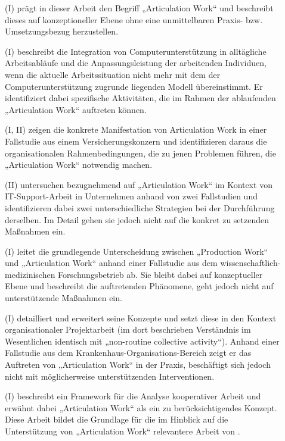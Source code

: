 \begin{description}
	\item[\citet{Strauss85}] (I) prägt in dieser Arbeit den Begriff „Articulation Work“ und beschreibt dieses auf konzeptioneller Ebene ohne eine unmittelbaren Praxis- bzw. Umsetzungsbezug herzustellen.
	\item[\citet{Gasser86}] (I) beschreibt die Integration von Computerunterstützung in alltägliche Arbeitsabläufe und die Anpassungsleistung der arbeitenden Individuen, wenn die aktuelle Arbeitssituation nicht mehr mit dem der Computerunterstützung zugrunde liegenden Modell übereinstimmt. Er identifiziert dabei spezifische Aktivitäten, die im Rahmen der ablaufenden „Articulation Work“ auftreten können.
	\item[\citet{Gerson86}] (I, II) zeigen die konkrete Manifestation von Articulation Work in einer Fallstudie aus einem Versicherungskonzern und identifizieren daraus die organisationalen Rahmenbedingungen, die zu jenen Problemen führen, die „Articulation Work“ notwendig machen.
	\item[\citet{Bendifallah87}] (II) untersuchen bezugnehmend auf \citet{Gasser86} „Articulation Work“ im Kontext von IT-Support-Arbeit in Unternehmen anhand von zwei Fallstudien und identifizieren dabei zwei unterschiedliche Strategien bei der Durchführung derselben. Im Detail gehen sie jedoch nicht auf die konkret zu setzenden Maßnahmen ein.
	\item[\citet{Fujimura87}] (I) leitet die grundlegende Unterscheidung zwischen „Production Work“ und „Articulation Work“ anhand einer Fallstudie aus dem wissen\-schaftlich-medizinischen Forschungsbetrieb ab. Sie bleibt dabei auf konzeptueller Ebene und beschreibt die auftretenden Phänomene, geht jedoch nicht auf unterstützende Maßnahmen ein.
	\item[\citet{Strauss88}] (I) detailliert und erweitert seine Konzepte und setzt diese in den Kontext organisationaler Projektarbeit (im dort beschrieben Verständnis im Wesentlichen identisch mit „non-routine collective activity“). Anhand einer Fallstudie aus dem Krankenhaus-Organisations-Bereich zeigt er das Auftreten von „Articulation Work“ in der Praxis, beschäftigt sich jedoch nicht mit möglicherweise unterstützenden Interventionen.
	\item[\citet{Schmidt90}] (I) beschreibt ein Framework für die Analyse kooperativer Arbeit und erwähnt dabei „Articulation Work“ als ein zu berücksichtigendes Konzept. Diese Arbeit bildet die Grundlage für die im Hinblick auf die Unterstützung von „Articulation Work“ relevantere Arbeit von \citet{Schmidt92}.

\end{description}
